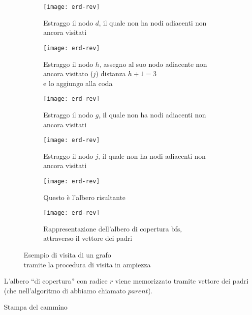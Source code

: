 \begin{figure}[H]

	\begin{subfigure}[t]{.45\textwidth}
		\addtocounter{subfigure}{6}
		\texttt{[image: erd-rev]}
		\caption{Estraggo il nodo \(d\),
			il quale non ha nodi adiacenti non ancora visitati}
	\end{subfigure}\hfill
	\begin{subfigure}[t]{.45\textwidth}
		\texttt{[image: erd-rev]}
		\caption{Estraggo il nodo \(h\),
			assegno al suo nodo adiacente non ancora visitato (\(j\)) distanza \(h+1 = 3\)\\
			e lo aggiungo alla coda}
	\end{subfigure}

	\begin{subfigure}[t]{.45\textwidth}
		\texttt{[image: erd-rev]}
		\caption{Estraggo il nodo \(g\),
			il quale non ha nodi adiacenti non ancora visitati}
	\end{subfigure}\hfill
	\begin{subfigure}[t]{.45\textwidth}
		\texttt{[image: erd-rev]}
		\caption{Estraggo il nodo \(j\),
			il quale non ha nodi adiacenti non ancora visitati}
	\end{subfigure}

	\begin{subfigure}[t]{.45\textwidth}
		\texttt{[image: erd-rev]}
		\caption{Questo è l'albero risultante}
	\end{subfigure}\hfill
	\begin{subfigure}[t]{.45\textwidth}
		\texttt{[image: erd-rev]}
		\caption{Rappresentazione dell'albero di copertura \textsf{bfs},
				 attraverso il vettore dei padri}
	\end{subfigure}

	\addtocounter{figure}{-1}
	\caption{Esempio di visita di un grafo\\tramite la procedura di visita in ampiezza}
\end{figure}

L'albero \enquote{di copertura} con radice \(r\) viene memorizzato tramite vettore dei padri (che nell'algoritmo di \erdos abbiamo chiamato \(parent\)).

\clearpage
\begin{algorithm}[H]
	\caption{Stampa del cammino}
	
\end{algorithm}

